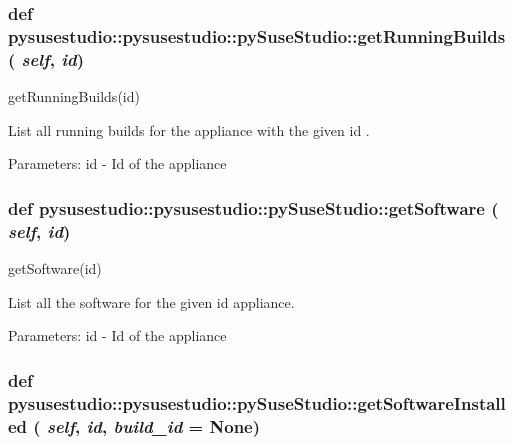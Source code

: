  \hypertarget{classpysusestudio_1_1pysusestudio_1_1py_suse_studio_abb23ba59180d9942ae1d6c6eea84e32d}{
\subsubsection[{getRunningBuilds}]{\setlength{\rightskip}{0pt plus 5cm}def pysusestudio::pysusestudio::pySuseStudio::getRunningBuilds ( {\em self}, \/   {\em id})}}
\label{classpysusestudio_1_1pysusestudio_1_1py_suse_studio_abb23ba59180d9942ae1d6c6eea84e32d}
\begin{DoxyVerb}getRunningBuilds(id)

        List all running builds for the appliance with the given id .
        
            Parameters:
id - Id of the appliance

\end{DoxyVerb}
 \hypertarget{classpysusestudio_1_1pysusestudio_1_1py_suse_studio_a40ef4edc4e233cff41d4373a04d1422a}{
\subsubsection[{getSoftware}]{\setlength{\rightskip}{0pt plus 5cm}def pysusestudio::pysusestudio::pySuseStudio::getSoftware ( {\em self}, \/   {\em id})}}
\label{classpysusestudio_1_1pysusestudio_1_1py_suse_studio_a40ef4edc4e233cff41d4373a04d1422a}
\begin{DoxyVerb}getSoftware(id)

        List all the software for the given id appliance.  
            
            Parameters:
id - Id of the appliance

\end{DoxyVerb}
 \hypertarget{classpysusestudio_1_1pysusestudio_1_1py_suse_studio_a87cc59fb9ae5ca6a223b4650d88fac8f}{
\subsubsection[{getSoftwareInstalled}]{\setlength{\rightskip}{0pt plus 5cm}def pysusestudio::pysusestudio::pySuseStudio::getSoftwareInstalled ( {\em self}, \/   {\em id}, \/   {\em build\_\-id} = {\ttfamily None})}}
